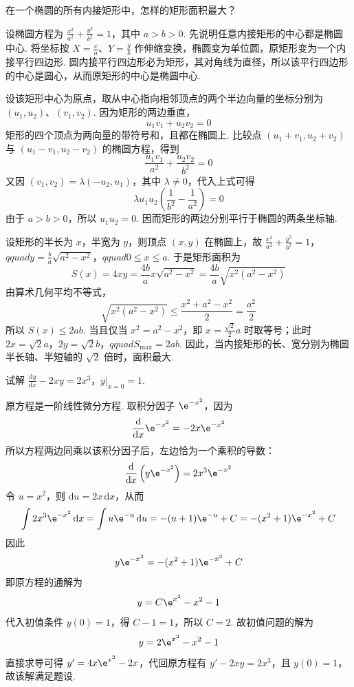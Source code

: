 \begin{problem}
在一个椭圆的所有内接矩形中，怎样的矩形面积最大？

\end{problem}

\begin{solution}
设椭圆方程为 \(\frac{x^2}{a^2}+\frac{y^2}{b^2}=1\)，其中 \(a>b>0\). 先说明任意内接矩形的中心都是椭圆中心. 将坐标按 \(X=\frac{x}{a}\)、\(Y=\frac{y}{b}\) 作伸缩变换，椭圆变为单位圆，原矩形变为一个内接平行四边形. 圆内接平行四边形必为矩形，其对角线为直径，所以该平行四边形的中心是圆心，从而原矩形的中心是椭圆中心.

设该矩形中心为原点，取从中心指向相邻顶点的两个半边向量的坐标分别为 \((u_1,u_2)\)、\((v_1,v_2)\). 因为矩形的两边垂直，
\[
u_1v_1+u_2v_2=0
\]
矩形的四个顶点为两向量的带符号和，且都在椭圆上. 比较点 \((u_1+v_1,u_2+v_2)\) 与 \((u_1-v_1,u_2-v_2)\) 的椭圆方程，得到
\[
\frac{u_1v_1}{a^2}+\frac{u_2v_2}{b^2}=0
\]
又因 \((v_1,v_2)=\lambda(-u_2,u_1)\)，其中 \(\lambda\ne0\)，代入上式可得
\[
\lambda u_1u_2\left(\frac{1}{b^2}-\frac{1}{a^2}\right)=0
\]
由于 \(a>b>0\)，所以 \(u_1u_2=0\). 因而矩形的两边分别平行于椭圆的两条坐标轴.

设矩形的半长为 \(x\)，半宽为 \(y\)，则顶点 \((x,y)\) 在椭圆上，故
\(\frac{x^2}{a^2}+\frac{y^2}{b^2}=1\)，\(qquad y=\frac{b}{a}\sqrt{a^2-x^2}\)，\(qquad 0\leq x\leq a\).
于是矩形面积为
\[
S(x)=4xy=\frac{4b}{a}x\sqrt{a^2-x^2}=\frac{4b}{a}\sqrt{x^2\left(a^2-x^2\right)}
\]
由算术几何平均不等式，
\[
\sqrt{x^2\left(a^2-x^2\right)}\leq\frac{x^2+a^2-x^2}{2}=\frac{a^2}{2}
\]
所以 \(S(x)\leq2ab\). 当且仅当 \(x^2=a^2-x^2\)，即 \(x=\frac{\sqrt{2}}{2}a\) 时取等号；此时
\(2x=\sqrt{2}a\)，\(2y=\sqrt{2}b\)，\(qquad S_{\max}=2ab\).
因此，当内接矩形的长、宽分别为椭圆半长轴、半短轴的 \(\sqrt{2}\) 倍时，面积最大.
\end{solution}

\begin{problem}
试解
\( \frac{\mathrm{d} y}{\mathrm{d} x}-2xy=2x^3 \)，\( y\big|_{x=0}=1 \).
\end{problem}

\begin{solution}
原方程是一阶线性微分方程. 取积分因子 \(\e^{-x^2}\)，因为
\[
\frac{\mathrm{d}}{\mathrm{d}x}\e^{-x^2}=-2x\e^{-x^2}
\]
所以方程两边同乘以该积分因子后，左边恰为一个乘积的导数：
\[
\frac{\mathrm{d}}{\mathrm{d}x}\left(y\e^{-x^2}\right)=2x^3\e^{-x^2}
\]
令 \(u=x^2\)，则 \(\mathrm{d}u=2x\,\mathrm{d}x\)，从而
\[
\int2x^3\e^{-x^2}\,\mathrm{d}x=\int u\e^{-u}\,\mathrm{d}u=-(u+1)\e^{-u}+C=-(x^2+1)\e^{-x^2}+C
\]
因此
\[
y\e^{-x^2}=-(x^2+1)\e^{-x^2}+C
\]
即原方程的通解为
\[
y=C\e^{x^2}-x^2-1
\]
代入初值条件 \(y(0)=1\)，得 \(C-1=1\)，所以 \(C=2\). 故初值问题的解为
\[
y=2\e^{x^2}-x^2-1
\]
直接求导可得 \(y'=4x\e^{x^2}-2x\)，代回原方程有 \(y'-2xy=2x^3\)，且 \(y(0)=1\)，故该解满足题设.
\end{solution}
